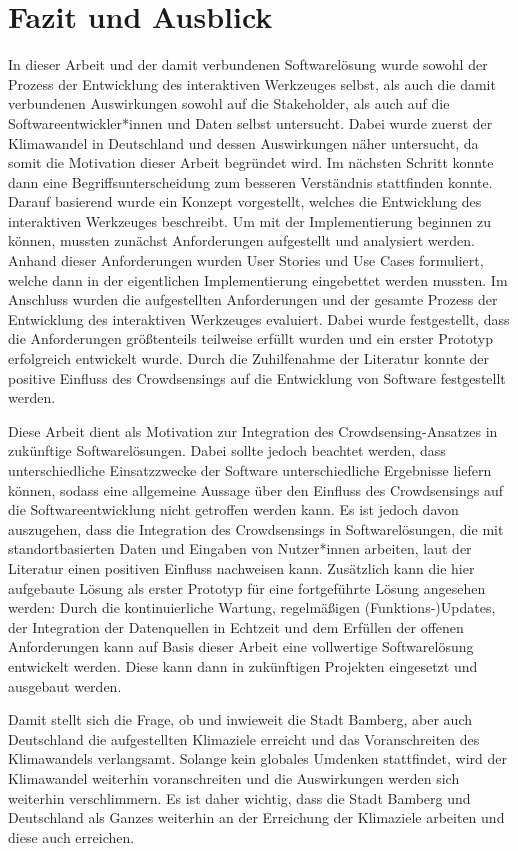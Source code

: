 \chapter{Fazit und Ausblick}

In dieser Arbeit und der damit verbundenen Softwarelösung wurde sowohl der Prozess der Entwicklung des interaktiven Werkzeuges selbst, als auch die damit verbundenen Auswirkungen sowohl auf die Stakeholder, als auch auf die Softwareentwickler*innen und Daten selbst untersucht. Dabei wurde zuerst der Klimawandel in Deutschland und dessen Auswirkungen näher untersucht, da somit die Motivation dieser Arbeit begründet wird. Im nächsten Schritt konnte dann eine Begriffsunterscheidung zum besseren Verständnis stattfinden konnte. Darauf basierend wurde ein Konzept vorgestellt, welches die Entwicklung des interaktiven Werkzeuges beschreibt. Um mit der Implementierung beginnen zu können, mussten zunächst Anforderungen aufgestellt und analysiert werden. Anhand dieser Anforderungen wurden User Stories und Use Cases formuliert, welche dann in der eigentlichen Implementierung eingebettet werden mussten. Im Anschluss wurden die aufgestellten Anforderungen und der gesamte Prozess der Entwicklung des interaktiven Werkzeuges evaluiert. Dabei wurde festgestellt, dass die Anforderungen größtenteils teilweise erfüllt wurden und ein erster Prototyp erfolgreich entwickelt wurde. Durch die Zuhilfenahme der Literatur konnte der positive Einfluss des Crowdsensings auf die Entwicklung von Software festgestellt werden.

Diese Arbeit dient als Motivation zur Integration des Crowdsensing-Ansatzes in zukünftige Softwarelösungen. Dabei sollte jedoch beachtet werden, dass unterschiedliche Einsatzzwecke der Software unterschiedliche Ergebnisse liefern können, sodass eine allgemeine Aussage über den Einfluss des Crowdsensings auf die Softwareentwicklung nicht getroffen werden kann. Es ist jedoch davon auszugehen, dass die Integration des Crowdsensings in Softwarelösungen, die mit standortbasierten Daten und Eingaben von Nutzer*innen arbeiten, laut der Literatur einen positiven Einfluss nachweisen kann. Zusätzlich kann die hier aufgebaute Lösung als erster Prototyp für eine fortgeführte Lösung angesehen werden: Durch die kontinuierliche Wartung, regelmäßigen (Funktions-)Updates, der Integration der Datenquellen in Echtzeit und dem Erfüllen der offenen Anforderungen kann auf Basis dieser Arbeit eine vollwertige Softwarelösung entwickelt werden. Diese kann dann in zukünftigen Projekten eingesetzt und ausgebaut werden.

Damit stellt sich die Frage, ob und inwieweit die Stadt Bamberg, aber auch Deutschland die aufgestellten Klimaziele erreicht und das Voranschreiten des Klimawandels verlangsamt. Solange kein globales Umdenken stattfindet, wird der Klimawandel weiterhin voranschreiten und die Auswirkungen werden sich weiterhin verschlimmern. Es ist daher wichtig, dass die Stadt Bamberg und Deutschland als Ganzes weiterhin an der Erreichung der Klimaziele arbeiten und diese auch erreichen.